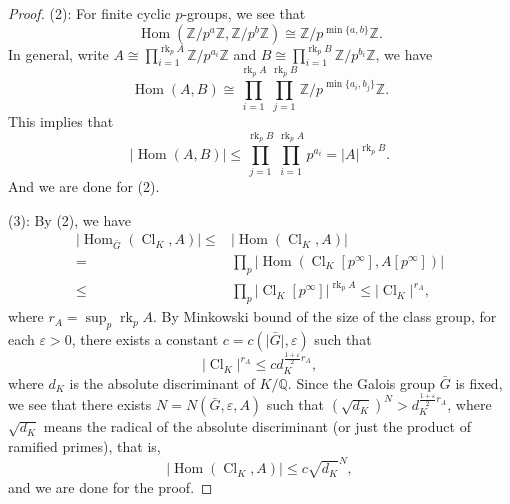 \documentclass{amsart}
\numberwithin{equation}{section}
\theoremstyle{plain}
\theoremstyle{definition}
\theoremstyle{remark}
\begin{document}
\begin{proof}
	(2):
	For finite cyclic $p$-groups, we see that
	\begin{equation*}
		\operatorname{Hom}(\mathbb{Z}/p^a\mathbb{Z},\mathbb{Z}/p^b\mathbb{Z})\cong\mathbb{Z}/p^{\min\{a,b\}}\mathbb{Z}.
	\end{equation*}
	In general, write $A\cong\prod_{i=1}^{\operatorname{rk}_p A}\mathbb{Z}/p^{a_i}\mathbb{Z}$ and $B\cong\prod_{i=1}^{\operatorname{rk}_p B}\mathbb{Z}/p^{b_i}\mathbb{Z}$, we have
	\begin{equation*}
		\operatorname{Hom}(A,B)\cong\prod_{i=1}^{\operatorname{rk}_p A}\prod_{j=1}^{\operatorname{rk}_p B}\mathbb{Z}/p^{\min\{a_i,b_j\}}\mathbb{Z}.
	\end{equation*}
	This implies that
	\begin{equation*}
		\lvert\operatorname{Hom}(A,B)\rvert\leq\prod_{j=1}^{\operatorname{rk}_p B}\prod_{i=1}^{\operatorname{rk}_p A}p^{a_i}=\lvert A\rvert^{\operatorname{rk}_p B}.
	\end{equation*}
	And we are done for (2).
	
	(3):
	By (2), we have
	\begin{equation*}
		\begin{aligned}
			\lvert\operatorname{Hom}_{\bar{G}}(\operatorname{Cl}_K,A)\rvert\leq&\lvert\operatorname{Hom}(\operatorname{Cl}_K,A)\rvert\\
			=&\prod_{p}\lvert\operatorname{Hom}(\operatorname{Cl}_K[p^\infty],A[p^\infty])\rvert
			\\
			\leq&\prod_p\lvert\operatorname{Cl}_K[p^\infty]\rvert^{\operatorname{rk}_p A}
			\leq\lvert\operatorname{Cl}_K\rvert^{r_A},
		\end{aligned}
	\end{equation*}
	where $r_A=\sup_p\operatorname{rk}_pA$.
	By Minkowski bound of the size of the class group, for each $\varepsilon>0$, there exists a constant $c=c(\lvert \bar{G}\rvert,\varepsilon)$ such that
	\begin{equation*}
		\lvert\operatorname{Cl}_K\rvert^{r_A}\leq c d_K^{\frac{1+\varepsilon}{2}r_A},
	\end{equation*}
	where $d_K$ is the absolute discriminant of $K/\mathbb{Q}$.
	Since the Galois group $\bar{G}$ is fixed, we see that there exists $N=N(\bar{G},\varepsilon,A)$ such that $(\sqrt{d_K})^N>d_K^{\frac{1+\varepsilon}{2}r_A}$, where $\sqrt{d_K}$ means the radical of the absolute discriminant (or just the product of ramified primes), that is, 
	\begin{equation*}
		\lvert\operatorname{Hom}(\operatorname{Cl}_K,A)\rvert\leq c\sqrt{d_K}^{N},
	\end{equation*}
	and we are done for the proof.
\end{proof}
\end{document}
